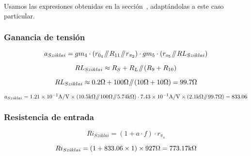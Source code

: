 Usamos las expresiones obtenidas en la sección~, adaptándolas a este caso particular.


\subsubsection{Ganancia de tensión}

\begin{equation}
a_{Sziklai} = gm_{4} \cdot \left( r_{0_{4}} \parallelresistors R_{11} \parallelresistors r_{\pi_{2}} \right) \cdot gm_{5} \cdot \left( r_{o_{5}} \parallelresistors R{L_{Sziklai}} \right)
\end{equation}

\begin{equation}
R{L_{Sziklai}} \approx R_{S} + R_{L} \parallelresistors \left( R_{9} + R_{10} \right)
\end{equation}

\begin{equation*}
R{L_{Sziklai}} \approx 0.2 \si[per-mode=symbol]{\ohm} + 100 \si[per-mode=symbol]{\ohm} \parallelresistors \left( 10 \si[per-mode=symbol]{\ohm} + 10 \si[per-mode=symbol]{\ohm} \right) = 99.7 \si[per-mode=symbol]{\ohm}
\end{equation*}


\begin{equation*}
a_{Sziklai} = \num{1.21E-1} \si[per-mode=symbol]{\ampere\per\volt} \times \left( 10.5 \si[per-mode=symbol]{\kilo\ohm} \parallelresistors 100 \si[per-mode=symbol]{\ohm} \parallelresistors  5.74 \si[per-mode=symbol]{\kilo\ohm} \right) \cdot \num{7.43E-1} \si[per-mode=symbol]{\ampere\per\volt} \times \left( 2.1 \si[per-mode=symbol]{\kilo\ohm} \parallelresistors 99.7 \si[per-mode=symbol]{\ohm} \right) = 833.06
\end{equation*}



\subsubsection{Resistencia de entrada}

\begin{equation}
R{i_{Sziklai}} = \left( 1 + a \cdot f \right) \cdot r_{\pi_{4}}
\end{equation}

\begin{equation*}
R{i_{Sziklai}} = \left( 1 + 833.06 \times 1 \right) \times 927  \si[per-mode=symbol]{\ohm} = 773.17 \si[per-mode=symbol]{\kilo\ohm}
\end{equation*}



